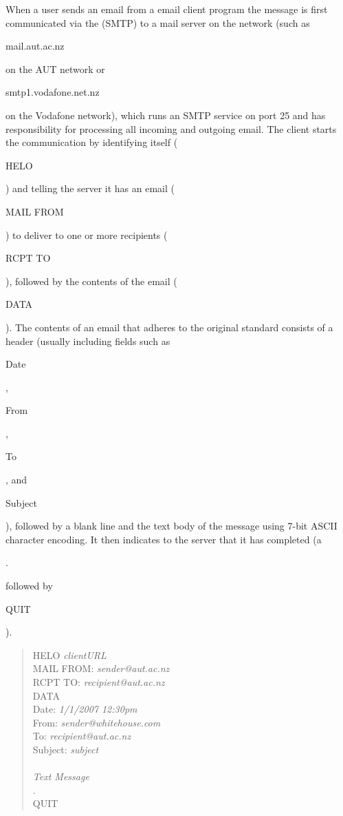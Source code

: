 When a user sends an email from a email client program
the message is first communicated via the  (SMTP)
to a mail server on the network
(such as \begin{code}mail.aut.ac.nz\end{code} on the AUT network
or \begin{code}smtp1.voda\-fone.net.nz\end{code} on the Vodafone network),
which runs an SMTP service on port 25 and has responsibility for processing all
incoming and outgoing email.
The client starts the communication by identifying itself (\begin{code}HELO\end{code})
and telling the server it has an email (\begin{code}MAIL FROM\end{code}) to deliver to
one or more recipients (\begin{code}RCPT TO\end{code}), followed by the contents
of the email (\begin{code}DATA\end{code}).
The contents of an email that adheres to the original  standard
consists of a header (usually including fields such
as \begin{code}Date\end{code}, \begin{code}From\end{code}, \begin{code}To\end{code},
and \begin{code}Subject\end{code}), followed by a blank line and the text body
of the message using 7-bit ASCII character encoding.
It then indicates to the server that it has completed
(a \begin{code}.\end{code} followed by \begin{code}QUIT\end{code}).
\begin{quote}\begin{code}
HELO \emph{clientURL} \\
MAIL FROM: \emph{sender@aut.ac.nz} \\
RCPT TO: \emph{recipient@aut.ac.nz} \\
DATA \\
Date: \emph{1/1/2007 12:30pm} \\
From: \emph{sender@whitehouse.com} \\
To: \emph{recipient@aut.ac.nz} \\
Subject: \emph{subject} \\
\\
\emph{Text Message} \\
. \\
QUIT \\
\end{code}\end{quote}
